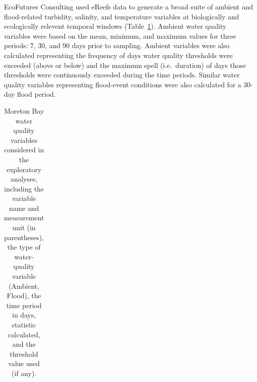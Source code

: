 \documentclass[
  letterpaper,
  DIV=11,
  numbers=noendperiod]{scrartcl}
\begin{document}
EcoFutures Consulting used eReefs data \citep{steven2019ereefs} to
generate a broad suite of ambient and flood-related turbidity, salinity,
and temperature variables at biologically and ecologically relevent
temporal windows (Table~\ref{tbl-wq_vars_mb}). Ambient water quality
variables were based on the mean, minimum, and maximum values for three
periods: 7, 30, and 90 days prior to sampling. Ambient variables were
also calculated representing the frequency of days water quality
thresholds were exceeded (above or below) and the maximum spell
(i.e.~duration) of days those thresholds were continuously exceeded
during the time periods. Similar water quality variables representing
flood-event conditions were also calculated for a 30-day flood period.

\begin{longtable}[]{@{}lllll@{}}

\caption{\label{tbl-wq_vars_mb}Moreton Bay water quality variables
considered in the exploratory analyses, including the variable name and
measurement unit (in parentheses), the type of water-quality variable
(Ambient, Flood), the time period in days, statistic calculated, and the
threshold value used (if any).}

\tabularnewline


\end{longtable}
\end{document}
